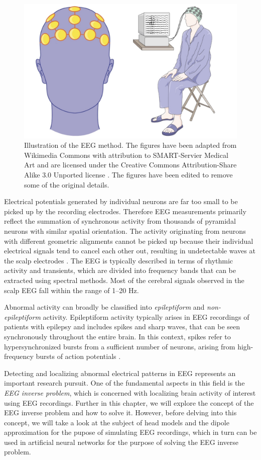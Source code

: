 \documentclass[a4paper, UKenglish, 11pt]{uiomaster}
\begin{document}
\begin{figure}[!htb]
    \centering
    \includegraphics[width=0.6\linewidth]{figures/new_eeg_wiki.jpg}
    \caption{Illustration of the EEG method. The figures have been adapted from Wikimedia Commons with attribution to SMART-Servier Medical Art and are licensed under the Creative Commons Attribution-Share Alike 3.0 Unported license \cite{EEG_head} \cite{EEG_full_body}. The figures have been edited to remove some of the original details.}
    \label{fig:EEG}
\end{figure}

Electrical potentials generated by individual neurons are far too small to be picked up by the recording electrodes. Therefore EEG measurements primarily reflect the summation of synchronous activity from thousands of pyramidal neurons with similar spatial orientation. The activity originating from neurons with different geometric alignments cannot be picked up because their individual electrical signals tend to cancel each other out, resulting in undetectable waves at the scalp electrodes \cite{bromfield2006introduction}. The EEG is typically described in terms of rhythmic activity and transients, which are divided into frequency bands that can be extracted using spectral methods. Most of the cerebral signals observed in the scalp EEG fall within the range of 1–20 Hz.

Abnormal activity can broadly be classified into \emph{epileptiform} and \emph{non-epileptiform} activity. Epileptiform activity typically arises in EEG recordings of patients with epilepsy and includes spikes and sharp waves, that can be seen synchronously throughout the entire brain. In this context, spikes refer to hypersynchronized bursts from a sufficient number of neurons, arising from high-frequency bursts of action potentials \cite{bromfield2006introduction}.

Detecting and localizing abnormal electrical patterns in EEG represents an important research pursuit. One of the fundamental aspects in this field is the \emph{EEG inverse problem}, which is concerned with localizing brain activity of interest using EEG recordings. Further in this chapter, we will explore the concept of the EEG inverse problem and how to solve it. However, before delving into this concept, we will take a look at the subject of head models and the dipole approximation for the pupose of simulating EEG recordings, which in turn can be used in artificial neural networks for the purpose of solving the EEG inverse problem.
\end{document}
